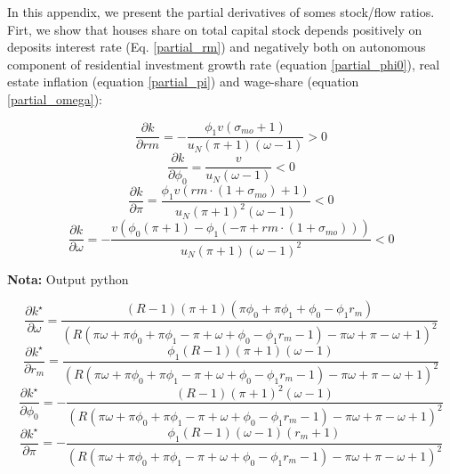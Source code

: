\documentclass[11pt]{article}
\begin{document}
In this appendix, we present the partial derivatives of somes stock/flow ratios.
Firt, we show that houses share on total capital stock depends positively on deposits interest rate (Eq. \ref{partial_rm}) and negatively both on autonomous component of residential investment growth rate (equation \ref{partial_phi0}), real estate inflation (equation \ref{partial_pi}) and wage-share (equation \ref{partial_omega}):


\begin{equation}
\label{partial_rm}
\frac{\partial k}{\partial rm} = - \frac{\phi_{1} v \left(\sigma_{mo} + 1\right)}{u_N \left(\pi + 1\right) \left(\omega - 1\right)} > 0
\end{equation}
\begin{equation}
\label{partial_phi0}
\frac{\partial k}{\partial \phi_0} = \frac{v}{u_N \left(\omega - 1\right)} < 0
\end{equation}
\begin{equation}
\label{partial_pi}
\frac{\partial k}{\partial \pi} = \frac{\phi_{1} v \left(rm\cdot(1+\sigma_{mo}) + 1\right)}{u_N \left(\pi + 1\right)^{2} \left(\omega - 1\right)} < 0
\end{equation}
\begin{equation}
\label{partial_omega}
\frac{\partial k}{\partial \omega} = - \frac{v \left(\phi_{0} \left(\pi + 1\right) - \phi_{1} \left(- \pi + rm\cdot(1 + \sigma_{mo})\right)\right)}{u_N \left(\pi + 1\right) \left(\omega - 1\right)^{2}} < 0
\end{equation}


\textbf{Nota:} Output python

\begin{equation}\frac{\partial k^{\star}}{\partial \omega} = \frac{\left(R - 1\right) \left(\pi + 1\right) \left(\pi \phi_{0} + \pi \phi_{1} + \phi_{0} - \phi_{1} r_{m}\right)}{\left(R \left(\pi \omega + \pi \phi_{0} + \pi \phi_{1} - \pi + \omega + \phi_{0} - \phi_{1} r_{m} - 1\right) - \pi \omega + \pi - \omega + 1\right)^{2}}\end{equation}
\begin{equation}\frac{\partial k^{\star}}{\partial r_{m}} = \frac{\phi_{1} \left(R - 1\right) \left(\pi + 1\right) \left(\omega - 1\right)}{\left(R \left(\pi \omega + \pi \phi_{0} + \pi \phi_{1} - \pi + \omega + \phi_{0} - \phi_{1} r_{m} - 1\right) - \pi \omega + \pi - \omega + 1\right)^{2}}\end{equation}
\begin{equation}\frac{\partial k^{\star}}{\partial \phi_{0}} = - \frac{\left(R - 1\right) \left(\pi + 1\right)^{2} \left(\omega - 1\right)}{\left(R \left(\pi \omega + \pi \phi_{0} + \pi \phi_{1} - \pi + \omega + \phi_{0} - \phi_{1} r_{m} - 1\right) - \pi \omega + \pi - \omega + 1\right)^{2}}\end{equation}
\begin{equation}\frac{\partial k^{\star}}{\partial \pi} = - \frac{\phi_{1} \left(R - 1\right) \left(\omega - 1\right) \left(r_{m} + 1\right)}{\left(R \left(\pi \omega + \pi \phi_{0} + \pi \phi_{1} - \pi + \omega + \phi_{0} - \phi_{1} r_{m} - 1\right) - \pi \omega + \pi - \omega + 1\right)^{2}}\end{equation}
\end{document}
